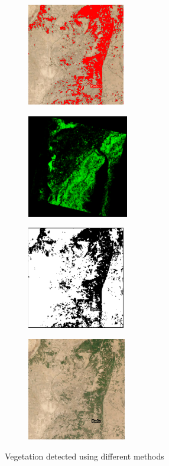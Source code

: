 \documentclass[12pt,a4paper,IEEEtran]{article}
\begin{document}
\begin{figure}[ht]
    \centering
    \begin{subfigure}{0.40\textwidth}
        \includegraphics[width=\linewidth, height=4.5cm]{ex1_cluster.PNG} %
        \label{fig:subfig1}
    \end{subfigure}
    \hfill
    \begin{subfigure}{0.40\textwidth}
        \includegraphics[width=\linewidth, height=4.5cm]{ex1_NDVI.PNG} %
        \label{fig:subfig2}
    \end{subfigure}
	\hfill
    \begin{subfigure}{0.40\textwidth}
        \includegraphics[width=\linewidth, height=4.5cm]{ex1_sat.PNG} %
        \label{fig:subfig2}
    \end{subfigure}
	\hfill
    \begin{subfigure}{0.40\textwidth}
        \includegraphics[width=\linewidth, height=4.5cm]{example1.PNG} %
        \label{fig:subfig2}
    \end{subfigure}
    \caption{Vegetation detected using different methods}
	

\end{figure}
\end{document}
